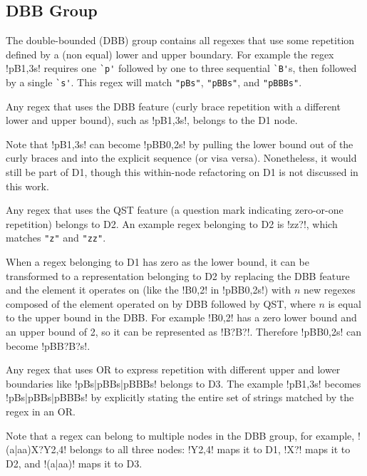 \subsection{DBB Group}
The double-bounded (DBB) group contains all regexes that use some repetition defined by a (non equal) lower and upper boundary.  For example the regex \cverb!pB{1,3}s! requires one \verb!`p'! followed by one to three sequential \verb!`B'!s, then followed by a single \verb!`s'!.  This regex will match \verb!"pBs"!, \verb!"pBBs"!, and \verb!"pBBBs"!.

\begin{description}  \itemsep -1pt
\item[D1:] Any regex that uses the DBB feature (curly brace repetition with a different lower and upper bound), such as \cverb!pB{1,3}s!, belongs to the D1 node.

Note that \cverb!pB{1,3}s! can become \cverb!pBB{0,2}s! by pulling the lower bound out of the curly braces and into the explicit sequence (or visa versa). Nonetheless, it would still be part of D1, though this within-node refactoring on D1 is not discussed in this work.
\item[D2:] Any regex that uses the QST feature (a question mark indicating zero-or-one repetition) belongs to D2. An example regex belonging to D2 is \cverb!zz?!, which matches \verb!"z"! and \verb!"zz"!.

When a regex belonging to D1 has zero as the lower bound, it can be transformed to a representation belonging to D2 by replacing the DBB feature and the element it operates on (like the \cverb!B{0,2}! in \cverb!pBB{0,2}s!) with $n$ new regexes composed of the element operated on by DBB followed by QST, where $n$ is equal to the upper bound in the DBB.  For example \cverb!B{0,2}! has a zero lower bound and an upper bound of 2, so it can be represented as \cverb!B?B?!.  Therefore \cverb!pBB{0,2}s! can become \cverb!pBB?B?s!.
\item[D3:] Any regex that uses OR to express repetition with different upper and lower boundaries like \cverb!pBs|pBBs|pBBBs! belongs to D3.  The example \cverb!pB{1,3}s! becomes \cverb!pBs|pBBs|pBBBs! by explicitly stating the entire set of strings matched by the regex in an OR.
\end{description}

Note that a regex can belong to multiple nodes in the DBB group, for example, \cverb!(a|aa)X?Y{2,4}! belongs to all three nodes: \cverb!Y{2,4}! maps it to D1, \cverb!X?! maps it to D2, and \cverb!(a|aa)! maps it to D3.

